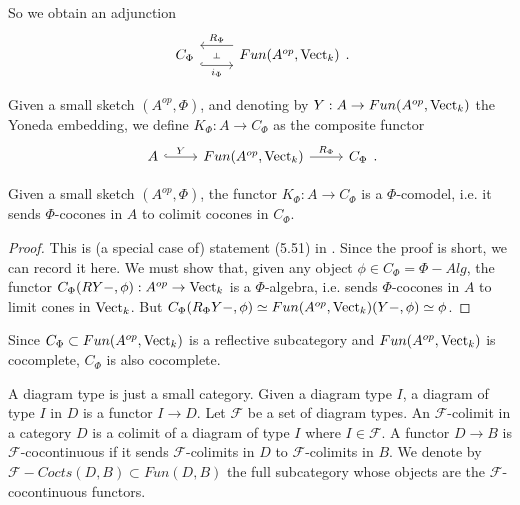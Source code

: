 So we obtain an adjunction \[\begin{tikzcd}
	{C_{\Phi}} & {Fun(A^{op},\Vect_k)}
	\arrow[""{name=0, anchor=center, inner sep=0}, "i_{\Phi}"', shift right=3, hook, from=1-1, to=1-2]
	\arrow[""{name=1, anchor=center, inner sep=0}, "R_{\Phi}"', shift right=3, from=1-2, to=1-1]
	\arrow["\dashv"{anchor=center, rotate=-90}, draw=none, from=1, to=0]
\end{tikzcd}.\]

\begin{definition} Given a small sketch $(A^{op},\Phi)$, and denoting by $Y:A\to Fun(A^{op},\operatorname{Vect}_k)$ the Yoneda embedding, we define $K_{\Phi}:A\to C_{\Phi}$ as the composite functor \[\begin{tikzcd}
	A & {Fun(A^{op},\Vect_k)} & {C_{\Phi}}
	\arrow["Y", hook, from=1-1, to=1-2]
	\arrow["R_{\Phi}", from=1-2, to=1-3]
\end{tikzcd}.\]\end{definition}

\begin{lemma}
Given a small sketch $(A^{op},\Phi)$, the functor $K_{\Phi}:A\to C_{\Phi}$ is a $\Phi$-comodel, i.e. it sends $\Phi$-cocones in $A$ to colimit cocones in $C_{\Phi}$.\end{lemma}
\begin{proof}This is (a special case of) statement (5.51) in \cite{kelly/basic-concepts-enriched}. Since the proof is short, we can record it here. We must show that, given any object $\phi\in C_{\Phi}=\Phi-Alg$, the functor $C_{\Phi}(RY-,\phi):A^{op}\to\operatorname{Vect}_k$ is a $\Phi$-algebra, i.e. sends $\Phi$-cocones in $A$ to limit cones in $\operatorname{Vect}_k$. But $C_{\Phi}(R_{\Phi}Y-,\phi)\simeq Fun(A^{op},\operatorname{Vect}_k)(Y-,\phi)\simeq\phi$.\end{proof}


\begin{remark}

Since $C_{\Phi}\subset Fun(A^{op},\operatorname{Vect}_k)$ is a reflective subcategory and $Fun(A^{op},\operatorname{Vect}_k)$ is cocomplete, $C_{\Phi}$ is also cocomplete.\end{remark}

\begin{definition}
A diagram type is just a small category. Given a diagram type $I$, a diagram of type $I$ in $D$ is a functor $I\to D$. Let $\mathcal{F}$ be a set of diagram types. An $\mathcal{F}$-colimit in a category $D$ is a colimit of a diagram of type $I$ where $I\in \mathcal{F}$. A functor $D\to B$ is $\mathcal{F}$-cocontinuous if it sends $\mathcal{F}$-colimits in $D$ to $\mathcal{F}$-colimits in $B$. We denote by $\mathcal{F}-Cocts(D,B)\subset Fun(D,B)$ the full subcategory whose objects are the $\mathcal{F}$-cocontinuous functors.\end{definition}

